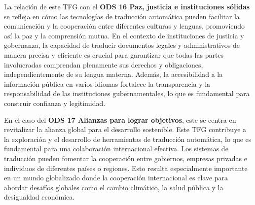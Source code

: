 \documentclass[11pt]{article}
\begin{document}
La relación de este TFG con el \textbf{ODS 16 Paz, justicia e instituciones sólidas} se refleja en cómo las tecnologías de traducción automática pueden facilitar la comunicación y la cooperación entre diferentes culturas y lenguas, promoviendo así la paz y la comprensión mutua. En el contexto de instituciones de justicia y gobernanza, la capacidad de traducir documentos legales y administrativos de manera precisa y eficiente es crucial para garantizar que todas las partes involucradas comprendan plenamente sus derechos y obligaciones, independientemente de su lengua materna. Además, la accesibilidad a la información pública en varios idiomas fortalece la transparencia y la responsabilidad de las instituciones gubernamentales, lo que es fundamental para construir confianza y legitimidad.

En el caso del \textbf{ODS 17 Alianzas para lograr objetivos}, este se centra en revitalizar la alianza global para el desarrollo sostenible. Este TFG contribuye a la exploración y el desarrollo de herramientas de traducción automática, lo que es fundamental para una colaboración internacional efectiva. Los sistemas de traducción pueden fomentar la cooperación entre gobiernos, empresas privadas e individuos de diferentes países o regiones. Esto resulta especialmente importante en un mundo globalizado donde la cooperación internacional es clave para abordar desafíos globales como el cambio climático, la salud pública y la desigualdad económica.
\end{document}
